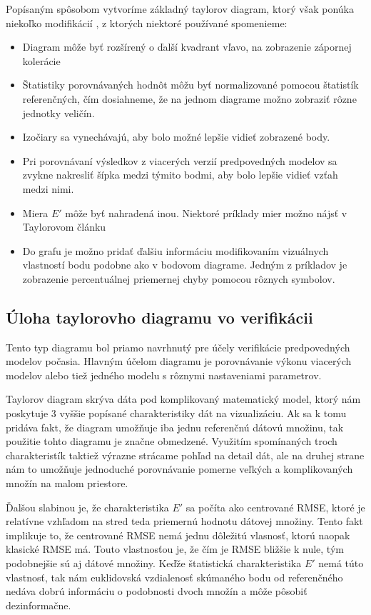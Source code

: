 Popísaným spôsobom vytvoríme základný taylorov diagram, ktorý však ponúka niekoľko modifikácií \cite{TaylorPrime}, z ktorých niektoré používané spomenieme:

\begin{singlespacing}
\begin{itemize} 
	\item Diagram môže byť rozšírený o ďalší kvadrant vľavo, na zobrazenie zápornej kolerácie 
	\item Štatistiky porovnávaných hodnôt môžu byť normalizované pomocou štatistík referenčných, čím dosiahneme, že na jednom diagrame možno zobraziť rôzne jednotky veličín.
	\item Izočiary sa vynechávajú, aby bolo možné lepšie vidieť zobrazené body.
	\item Pri porovnávaní výsledkov z viacerých verzií predpovedných modelov sa zvykne nakresliť šípka medzi týmito bodmi, aby bolo lepšie vidieť vzťah medzi nimi.
	\item Miera $ E' $ môže byť nahradená inou. Niektoré príklady mier možno nájsť v Taylorovom článku \cite{Taylor}
	\item Do grafu je možno pridať ďalšiu informáciu modifikovaním vizuálnych vlastností bodu podobne ako v bodovom diagrame. Jedným z príkladov je zobrazenie percentuálnej priemernej chyby pomocou rôznych symbolov.
\end{itemize}
\end{singlespacing}



\subsection{Úloha taylorovho diagramu vo verifikácii}
Tento typ diagramu bol priamo navrhnutý pre účely verifikácie predpovedných modelov počasia. Hlavným účelom diagramu je porovnávanie výkonu viacerých modelov alebo tiež jedného modelu s rôznymi nastaveniami parametrov. 

Taylorov diagram skrýva dáta pod komplikovaný matematický model, ktorý nám poskytuje 3 vyššie popísané charakteristiky dát na vizualizáciu. Ak sa k tomu pridáva fakt, že diagram umožňuje iba jednu referenčnú dátovú množinu, tak použitie tohto diagramu je značne obmedzené. Využitím spomínaných troch charakteristík taktiež výrazne strácame pohľad na detail dát, ale na druhej strane nám to umožňuje jednoduché porovnávanie pomerne veľkých a komplikovaných množín na malom priestore. 

Ďalšou slabinou je, že charakteristika $ E' $ sa počíta ako centrované RMSE, ktoré je relatívne vzhľadom na stred teda priemernú hodnotu dátovej množiny. Tento fakt implikuje to, že centrované RMSE nemá jednu dôležitú vlasnosť, ktorú naopak klasické RMSE má. Touto vlastnosťou je, že čím je RMSE bližšie k nule, tým podobnejšie sú aj dátové množiny. Keďže štatistická charakteristika $ E' $ nemá túto vlastnosť, tak nám euklidovská vzdialenosť skúmaného bodu od referenčného nedáva dobrú informáciu o podobnosti dvoch množín a môže pôsobiť dezinformačne.